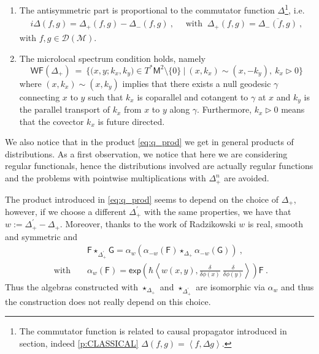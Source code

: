 \documentclass[11pt]{book}
\newcommand{\WF}{\mathsf{WF}}
\renewcommand{\exp}{\mathsf{exp}}
\newcommand{\sm}[1]{\left\langle#1\right\rangle}
\newcommand{\Dcal}{\mathcal{D}}
\newcommand{\Mcal}{\mathcal{M}}
\newcommand{\Fsf}{\mathsf{F}}
\newcommand{\Gsf}{\mathsf{G}}
\newcommand{\Msf}{\mathsf{M}}
\theoremstyle{break}
\begin{document}
\begin{enumerate}
\item The antisymmetric part is proportional to the commutator function $\Delta$\footnote{The commutator function is related to causal propagator introduced in section, indeed \ref{p:CLASSICAL} $\Delta(f,g)=\sm{f,\Delta g}$.}, i.e. 
%
\begin{eqnarray*}
i \Delta(f,g) = \Delta_+(f,g) - \Delta_-(f,g) \ , \quad \mbox{ with } \ \Delta_+(f,g) = \overline{\Delta_-(f,g)} \ ,
\end{eqnarray*}
%
with $f,g \in \Dcal(\Mcal)$.

\item The microlocal spectrum condition holds, namely
%
\begin{equation}
\WF(\Delta_+) \ = \ \bigg\{ \bigg( x, y ; k_x, k_y \bigg) \in T^\ast\Msf^2 \setminus \{0\} \ \bigg| \ (x,k_x) \sim (x,-k_y), \ k_x \triangleright 0 \bigg\} 
\label{eq:wf_hadamard}
\end{equation}
%
where $(x,k_x) \sim (x,k_y)$ implies that there exists a null geodesic $\gamma$ connecting $x$ to $y$ such that $k_x$ is coparallel and cotangent to $\gamma$ at $x$ and $k_y$ is the parallel transport of $k_x$ from $x$ to $y$ along $\gamma$. Furthermore, $k_x \triangleright 0$ means that the covector $k_x$ is future directed.
\end{enumerate}


We also notice that in the product \eqref{eq:q_prod} we get in general products of distributions. As a first observation, we notice that here we are considering regular functionals, hence the distributions involved are actually regular functions and the problems with pointwise multiplications with $\Delta_+^n$ are avoided.


The product introduced in \eqref{eq:q_prod} seems to depend on the choice of $\Delta_+$, however, if we choose a different $\Delta^\prime_+$ with the same properties, we have that $w:=\Delta^\prime_+ - \Delta_+$. Moreover, thanks to the work of Radzikowski \cite{radzikowski_micro-local_1996} $w$ is real, smooth and symmetric and
%
\begin{eqnarray}
&& \Fsf \star_{\Delta^\prime_+} \Gsf = \alpha_w \left(\alpha_{-w}(\Fsf) \star_{\Delta_+} \alpha_{-w}(\Gsf)\right) \ , \nonumber \\[6pt]
\mbox{ with } && \alpha_{w}(\Fsf) = \exp\left(\hbar \sm{ w(x,y) , \frac{\delta}{\delta\phi(x)} \ \frac{\delta}{\delta\phi(y)} } \right) \Fsf \ .
\label{eq:alpha_isomorph}
\end{eqnarray}
%
Thus the algebras constructed with $\star_{\Delta_+}$ and $\star_{\Delta^\prime_+}$ are isomorphic via $\alpha_{w}$ and thus the construction does not really depend on this choice. 
\end{document}
